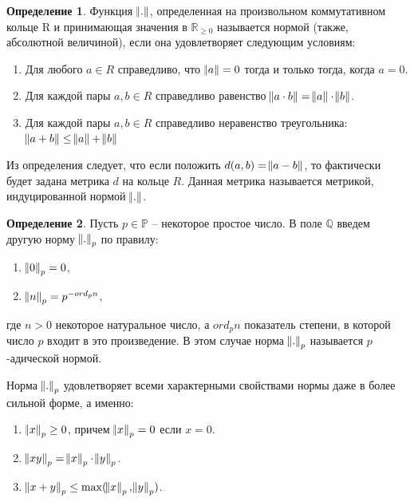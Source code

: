 \documentclass[master, och, diploma, times]{sty/SCWorks}
\theoremstyle{plain}
\theoremstyle{definition}
\newtheorem{defn}{Определение}[section]
\numberwithin{equation}{section}
\begin{document}
\begin{defn}
Функция $\norm{.}$, определенная на произвольном коммутативном кольце R и принимающая значения в $\mathbb {R}_{\ge 0}$ называется нормой (также, абсолютной величиной), если она удовлетворяет следующим условиям:

\begin{enumerate} 
	\item Для любого $a \in R$ справедливо, что $\norm{a}=0$ тогда и только тогда, когда $a=0$.
	\item Для каждой пары $a, b \in R$ справедливо равенство $\norm{a \cdot b} = \norm{a} \cdot \norm{b}$.
	\item Для каждой пары $a, b \in R$ справедливо неравенство треугольника: $\norm{a + b} \le \norm{a} + \norm{b}$
\end{enumerate}
\end{defn}

Из определения следует, что если положить $d(a, b)= \norm{a - b}$, то фактически будет задана метрика $d$ на кольце $R$. Данная метрика называется метрикой, индуцированной нормой $\norm{.}$.

\begin{defn}
Пусть $p \in \mathbb {P}$ -- некоторое простое число. В поле $\mathbb {Q}$ введем другую норму $\norm{.}_p$ по правилу:

\begin{enumerate} 
	\item $\norm{0}_p = 0$,
	\item $\norm{n}_p = p ^ {-ord_pn}$,
\end{enumerate}

\noindent где $n > 0$ некоторое натуральное число, а $ord_pn$ показатель степени, в которой число $p$ входит в это произведение. В этом случае норма $\norm{.}_p$ называется $p$-адической нормой.
\end{defn}

Норма $\norm{.}_p$  удовлетворяет всеми характерными свойствами нормы даже в более сильной форме, а именно:

\begin{enumerate} 
	\item $\norm{x}_p \ge 0$, причем $\norm{x}_p = 0$ если $x = 0$.
	\item $\norm{xy}_p = \norm{x}_p \cdot \norm{y}_p$.
	\item $\norm{x + y}_p \le \max(\norm{x}_p, \norm{y}_p)$. \cite{bib:analysis:volovich}
\end{enumerate}
\end{document}
